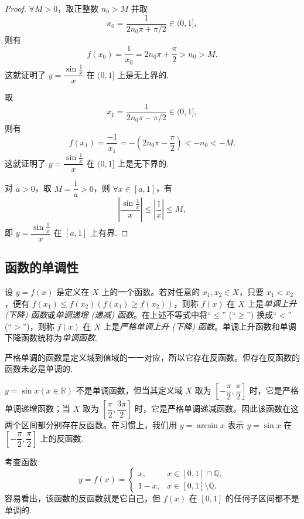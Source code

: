 \begin{proof}
$\forall M>0$，取正整数 $n_0>M$ 并取
\[
  x_0=\frac{1}{2n_0\pi+\pi/2}\in(0,1],
\]
则有
\[
  f(x_0)=\frac{1}{x_0}=2n_0\pi+\frac{\pi}{2}>n_0>M.
\]
这就证明了 $y=\dfrac{\sin\frac1x}{x}$ 在 $(0,1]$ 上是无上界的.

取
\[
  x_1=\frac{1}{2n_0\pi-\pi/2}\in(0,1],
\]
则有
\[
  f(x_1)=\frac{-1}{x_1}=-\left(2n_0\pi-\frac{\pi}{2}\right)<-n_0<-M.
\]
这就证明了 $y=\dfrac{\sin\frac1x}{x}$ 在 $(0,1]$ 上是无下界的.

对 $a>0$，取 $M=\dfrac1a>0$，则 $\forall x\in[a,1]$，有
\[
  \left|\frac{\sin\frac1x}{x}\right|\leqslant \left|\frac1x\right|\leqslant M,
\]
即 $y=\dfrac{\sin\frac1x}{x}$ 在 $[a,1]$ 上有界.
\end{proof}


\subsection{函数的单调性}
\label{subsec:ma-1-3-2}

设 $y=f(x)$ 是定义在 $X$ 上的一个函数。若对任意的 $x_1,x_2\in X$，只要 $x_1<x_2$，便有 $f(x_1)\leqslant f(x_2)(f(x_1)\geqslant f(x_2))$，则称 $f(x)$ 在 $X$ 上是\emph{单调上升 (下降) 函数}或\emph{单调递增 (递减) 函数}。在上述不等式中将``$\leqslant$'' (``$\geqslant$'') 换成``$<$'' (``$>$'')，则称 $f(x)$ 在 $X$ 上是\emph{严格单调上升 (下降) 函数}。单调上升函数和单调下降函数统称为\emph{单调函数}.

严格单调的函数是定义域到值域的一一对应，所以它存在反函数。但存在反函数的函数未必是单调的.

\begin{example}\label{example:ma-1-3-3}
$y=\sin x(x\in\mathbb{R})$ 不是单调函数，但当其定义域 $X$ 取为 $\left[-\dfrac\pi2,\dfrac\pi2\right]$ 时，它是严格单调递增函数；当 $X$ 取为 $\left[\dfrac\pi2,\dfrac{3\pi}2\right]$ 时，它是严格单调递减函数。因此该函数在这两个区间都分别存在反函数。在习惯上，我们用 $y=\arcsin x$ 表示 $y=\sin x$ 在 $\left[-\dfrac\pi2,\dfrac\pi2\right]$ 上的反函数.
\end{example}


\begin{example}\label{example:ma-1-3-4}
考查函数
\[
  y=f(x)=
  \begin{cases}
    x, & x\in[0,1]\cap\mathbb{Q},\\
    1-x, & x\in[0,1]\setminus\mathbb{Q}.
  \end{cases}
\]
容易看出，该函数的反函数就是它自己，但 $f(x)$ 在 $[0,1]$ 的任何子区间都不是单调的.
\end{example}


